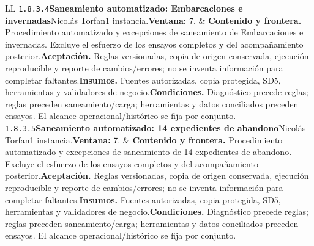 \begin{longtable}{L{\tabcolsep\relax}L{\tabcolsep\relax}}
\texttt{1.\allowbreak{}8.\allowbreak{}3.\allowbreak{}4}\newline{}\textbf{Saneamiento automatizado: Embarcaciones e invernadas}\newline{}Nicolás Torfan\newline{}1 instancia.\newline{}\textbf{Ventana:} 7. & \textbf{Contenido y frontera.} Procedimiento automatizado y excepciones de saneamiento de Embarcaciones e invernadas. Excluye el esfuerzo de los ensayos completos y del acompañamiento posterior.\newline{}\textbf{Aceptación.} Reglas versionadas, copia de origen conservada, ejecución reproducible y reporte de cambios/errores; no se inventa información para completar faltantes.\newline{}\textbf{Insumos.} Fuentes autorizadas, copia protegida, SD5, herramientas y validadores de negocio.\newline{}\textbf{Condiciones.} Diagnóstico precede reglas; reglas preceden saneamiento/carga; herramientas y datos conciliados preceden ensayos. El alcance operacional/histórico se fija por conjunto.\\\hline
\texttt{1.\allowbreak{}8.\allowbreak{}3.\allowbreak{}5}\newline{}\textbf{Saneamiento automatizado: 14 expedientes de abandono}\newline{}Nicolás Torfan\newline{}1 instancia.\newline{}\textbf{Ventana:} 7. & \textbf{Contenido y frontera.} Procedimiento automatizado y excepciones de saneamiento de 14 expedientes de abandono. Excluye el esfuerzo de los ensayos completos y del acompañamiento posterior.\newline{}\textbf{Aceptación.} Reglas versionadas, copia de origen conservada, ejecución reproducible y reporte de cambios/errores; no se inventa información para completar faltantes.\newline{}\textbf{Insumos.} Fuentes autorizadas, copia protegida, SD5, herramientas y validadores de negocio.\newline{}\textbf{Condiciones.} Diagnóstico precede reglas; reglas preceden saneamiento/carga; herramientas y datos conciliados preceden ensayos. El alcance operacional/histórico se fija por conjunto.\\\hline

\end{longtable}
